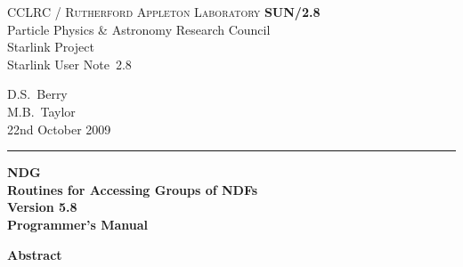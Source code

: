 \documentclass[twoside,11pt]{article}
\newcommand{\stardoccategory}  {Starlink User Note}
\newcommand{\stardocinitials}  {SUN}
\newcommand{\stardocnumber}    {2.8}
\newcommand{\stardocauthors}   {D.S.\ Berry \\ M.B.\ Taylor}
\newcommand{\stardocdate}      {22nd October 2009}
\newcommand{\stardoctitle}     {NDG \\ [\latex{1ex}]
                                Routines for Accessing Groups of NDFs}
\newcommand{\stardocversion}   {Version 5.8}
\newcommand{\stardocmanual}    {Programmer's Manual}
\newcommand{\stardocname}{\stardocinitials /\stardocnumber}
\newenvironment{latexonly}{}{}
\newcommand{\latex}[1]{#1}
\renewcommand{\_}{\texttt{\symbol{95}}}
\begin{document}
\thispagestyle{empty}

\begin{latexonly}
   CCLRC / \textsc{Rutherford Appleton Laboratory} \hfill \textbf{\stardocname}\\
   {\large Particle Physics \& Astronomy Research Council}\\
   {\large Starlink Project\\}
   {\large \stardoccategory\ \stardocnumber}
   \begin{flushright}
   \stardocauthors\\
   \stardocdate
   \end{flushright}
   \vspace{-4mm}
   \rule{\textwidth}{0.5mm}
   \vspace{5mm}
   \begin{center}
   {\Huge\textbf{\stardoctitle \\ [2.5ex]}}
   {\LARGE\textbf{\stardocversion \\ [4ex]}}
   {\Huge\textbf{\stardocmanual}}
   \end{center}
   \vspace{5mm}


   \vspace{10mm}
   \begin{center}
      {\Large\textbf{Abstract}}
   \end{center}
\end{latexonly}
\end{document}
